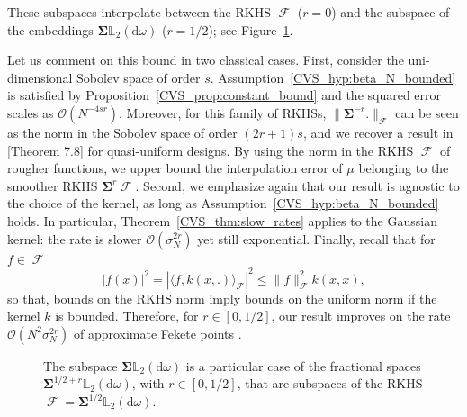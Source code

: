 \documentclass[twoside,11pt]{book}
\numberwithin{theorem}{chapter}
\numberwithin{definition}{chapter}
\numberwithin{proposition}{chapter}
\numberwithin{corollary}{chapter}
\numberwithin{example}{chapter}
\numberwithin{lemma}{chapter}
\numberwithin{assumption}{chapter}
\numberwithin{equation}{chapter}
\numberwithin{figure}{chapter}
\DeclareMathOperator{\F}{\mathcal{F}}
\begin{document}
These subspaces interpolate between the RKHS $\F$ ($r = 0$) and the subspace of the embeddings $\bm{\Sigma} \mathbb{L}_{2}(\mathrm{d}\omega)$ ($r = 1/2$); see Figure~\ref{CVS_fig:ellipsoids_in_ltwo}.

Let us comment on this bound in two classical cases. First, consider the uni-dimensional Sobolev space of order $s$. Assumption~\ref{CVS_hyp:beta_N_bounded} is satisfied by Proposition~\ref{CVS_prop:constant_bound} and the squared error scales as $\mathcal{O}(N^{-4sr})$. Moreover, for this family of RKHSs, $\|\bm{\Sigma}^{-r}.\|_{\F}$ can be seen as the norm in the Sobolev space of order $(2r+1)s$, and we recover a result in \parencite{ScWe06}[Theorem 7.8] for quasi-uniform designs. By using the norm in the RKHS $\F$ of rougher functions, we upper bound the interpolation error of $\mu$ belonging to the smoother RKHS $\bm{\Sigma}^{r} \F$. Second, we emphasize again that our result is agnostic to the choice of the kernel, as long as Assumption~\ref{CVS_hyp:beta_N_bounded} holds. In particular, Theorem~\ref{CVS_thm:slow_rates} applies to the Gaussian kernel: the rate is slower $\mathcal{O}(\sigma_{N}^{2r})$ yet still exponential. Finally, recall that for $f \in \F$
\begin{equation}
|f(x)|^{2} = |\langle f, k(x,.)\rangle_{\F}|^{2} \leq\|f\|_{\F}^{2} k(x,x),
\end{equation}
so that, bounds on the RKHS norm imply bounds on the uniform norm if the kernel $k$ is bounded. Therefore, for $r \in [0,1/2]$, our result improves on the rate $\mathcal{O}(N^{2}\sigma_{N}^{2r})$ of approximate Fekete points \parencite{KaSaTa19}.



\begin{figure}
    \centering
    \resizebox{0.6\textwidth}{!}{}
    \caption{The subspace $\bm{\Sigma}\mathbb{L}_{2}(\mathrm{d}\omega)$ is a particular case of the fractional spaces $\bm{\Sigma}^{1/2+r} \mathbb{L}_{2}(\mathrm{d}\omega)$, with $r \in [0,1/2]$, that are subspaces of the RKHS $\F = \bm{\Sigma}^{1/2} \mathbb{L}_{2}(\mathrm{d}\omega)$. \label{CVS_fig:ellipsoids_in_ltwo}}
\end{figure}




\end{document}
